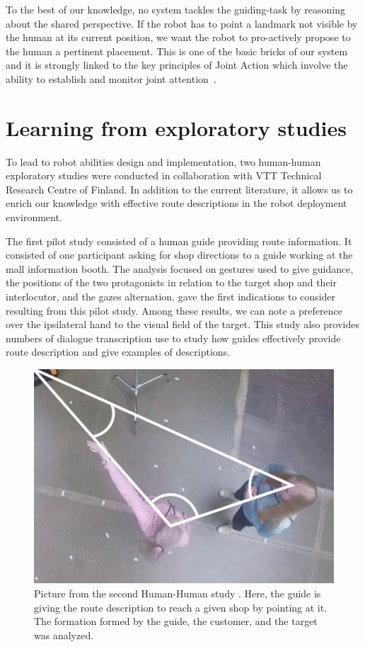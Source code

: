 To the best of our knowledge, no system tackles the guiding-task by reasoning about the shared perspective. If the robot has to point a landmark not visible by the human at its current position, we want the robot to pro-actively propose to the human a pertinent placement. This is one of the basic bricks of our system and it is strongly linked to the key principles of Joint Action which involve the ability to establish and monitor joint attention~\cite{pacherie_2012_phenomenology}.

\section{Learning from exploratory studies}

To lead to robot abilities design and implementation, two human-human exploratory studies were conducted in collaboration with VTT Technical Research Centre of Finland. In addition to the current literature, it allows us to enrich our knowledge with effective route descriptions in the robot deployment environment.

The first pilot study consisted of a human guide providing route information. It consisted of one participant asking for shop directions to a guide working at the mall information booth. The analysis focused on gestures used to give guidance, the positions of the two protagonists in relation to the target shop and their interlocutor, and the gazes alternation. \cite{belhassein_2017_human} gave the first indications to consider resulting from this pilot study. Among these results, we can note a preference over the ipsilateral hand to the visual field of the target. This study also provides numbers of dialogue transcription use to study how guides effectively provide route description and give examples of descriptions.

\begin{figure}[ht!]
\centering
\includegraphics[scale=0.35]{figures/chapter8/human_guide.png}
\caption{\label{fig:chap8_human_guide} Picture from the second Human-Human study \cite{belhassein_2017_human}. Here, the guide is giving the route description to reach a given shop by pointing at it. The formation formed by the guide, the customer, and the target was analyzed. }
\end{figure}

